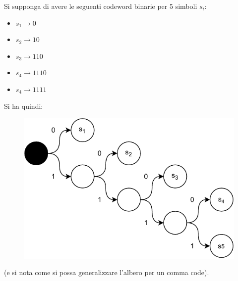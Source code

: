 \documentclass[a4paper,12pt, oneside]{book}
\begin{document}
\begin{esempio}
  Si supponga di avere le seguenti codeword binarie per 5 simboli $s_i$:
  \begin{itemize}
    \item $s_1\to 0$
    \item $s_2\to 10$
    \item $s_3\to 110$
    \item $s_4\to 1110$
    \item $s_4\to 1111$
  \end{itemize}
  Si ha quindi:
   \begin{figure}[H]
    \centering
    \includegraphics[scale = 0.8]{img/ct3.pdf}
  \end{figure}
  (e si nota come si possa generalizzare l'albero per un comma code).
\end{esempio}
\end{document}
